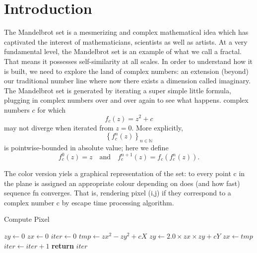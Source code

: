 \documentclass[sigconf]{acmart}
\begin{document}
\maketitle

\section{Introduction}
The Mandelbrot set is a mesmerizing and complex mathematical idea which has captivated the interest of mathematicians, scientists as well as artists. At a very fundamental level, the Mandelbrot set is an example of what we call a fractal. That means it possesses self-similarity at all scales. In order to understand how it is built, we need to explore the land of complex numbers: an extension (beyond) our traditional number line where now there exists a dimension called imaginary. The Mandelbrot set is generated by iterating a super simple little formula, plugging in complex numbers over and over again to see what happens. 
complex numbers \( c \) for which 
\[
f_c(z) = z^2 + c
\]
may not diverge when iterated from \( z = 0 \). More explicitly, 
\[
\left\{ f_c^n(z) \right\}_{n \in \mathbb{N}}
\]
is pointwise-bounded in absolute value; here we define 
\[
f_c^0(z) = z \quad \text{and} \quad f_c^{n+1}(z) = f_c(f_c^n(z)).
\]

The color version yiels a graphical representation of the set: to every point c in the plane is assigned an appropriate colour depending on does (and how fast) sequence fn converges. That is, rendering pixel (i,j) if they correspond to a complex number c by escape time processing algorithm.

\begin{algorithm}[H] %
\caption{Compute Pixel}
\begin{algorithmic}[1]
    \State $zy \gets 0$
    \State $zx \gets 0$
    \State $iter \gets 0$
        \State $tmp \gets zx^2 - zy^2 + cX$
        \State $zy \gets 2.0 \times zx \times zy + cY$
        \State $zx \gets tmp$
        \State $iter \gets iter + 1$
    \EndWhile
    \State \textbf{return} $iter$
\EndProcedure
\end{algorithmic}
\end{algorithm}
\end{document}
